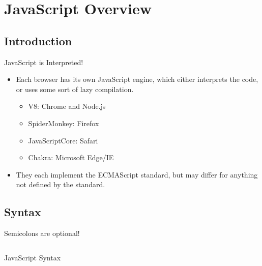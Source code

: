 \chapter{JavaScript Overview}
\section{Introduction}
JavaScript is Interpreted!
\begin{itemize}
	\item Each browser has its own JavaScript engine, which either interprets the code,
	      or uses some sort of lazy compilation.
	      \begin{itemize}
		      \item V8: Chrome and Node.js
		      \item SpiderMonkey: Firefox
		      \item JavaScriptCore: Safari
		      \item Chakra: Microsoft Edge/IE
	      \end{itemize}
	\item They each implement the ECMAScript standard, but may differ for anything not
	      defined by the standard.
\end{itemize}

\section{Syntax}
Semicolons are optional!
\begin{code}
	\inputminted{js}{src0/0-syntax.js}
	\caption{JavaScript Syntax}
\end{code}

